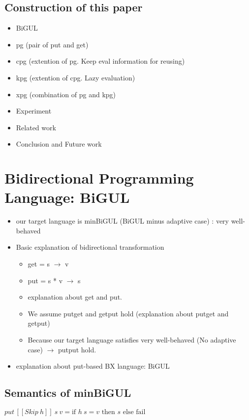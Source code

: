 \documentclass[runningheads]{llncs}
\newcommand{\sif}[3]{\text{if } #1 \text{ then } #2 \text{ else } #3}
\newcommand{\putbx}[3]{put \, [\![#1]\!] \ #2 \ #3}
\begin{document}
\subsection{Construction of this paper}

\begin{itemize}
\item BiGUL 
\item pg (pair of put and get)
\item cpg (extention of pg. Keep eval information for reusing)
\item kpg (extention of cpg. Lazy evaluation)
\item xpg (combination of pg and kpg)
\item Experiment
\item Related work
\item Conclusion and Future work
\end{itemize}

\section{Bidirectional Programming Language: BiGUL}

\begin{itemize}
\item our target language is minBiGUL (BiGUL minus adaptive case) : very well-behaved
\item Basic explanation of bidirectional transformation
  \begin{itemize}
  \item get = s $\to$ v
  \item put = s * v $\to$ s
  \item explanation about get and put.
  \item We assume putget and getput hold (explanation about putget and getput)
  \item Because our target language satisfies very well-behaved (No adaptive case) $\to$ putput hold.
  \end{itemize}
\item explanation about put-based BX language: BiGUL
\end{itemize}

\subsection{Semantics of minBiGUL}

$\putbx{Skip \ h}{s}{v} = \sif{h \ s = v}{s}{\text{fail}}$
\end{document}

